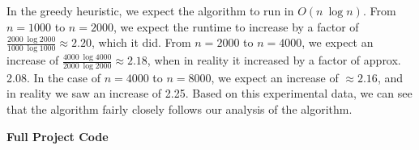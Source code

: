 \documentclass[12pt]{article}
\begin{document}
\begin{enumerate}
          In the greedy heuristic, we expect the algorithm to run in $O(n\ \log n)$.
          From $n=1000$ to $n=2000$, we expect the runtime to increase by a factor of
          $\frac{2000\ \log 2000}{1000\ \log 1000} \approx 2.20$, which it did. From
          $n=2000$ to $n=4000$, we expect an increase of $\frac{4000\ \log 4000}{2000
                  \ \log 2000} \approx 2.18$, when in reality it increased by a factor of
          approx. 2.08. In the case of $n=4000$ to $n=8000$, we expect an increase of
          $\approx 2.16$, and in reality we saw an increase of 2.25. Based on this
          experimental data, we can see that the algorithm fairly closely follows our
          analysis of the algorithm.
          
\end{enumerate}
\pagebreak
{\bf
    Full Project Code
}
\end{document}
